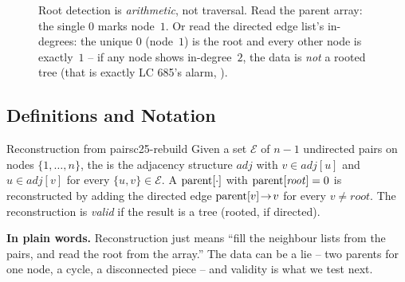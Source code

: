 \begin{figure}[H]
\centering
{}
\caption{Root detection is \emph{arithmetic}, not traversal. Read the parent array: the single $0$
marks node~$1$. Or read the directed edge list's in-degrees: the unique $0$ (node~$1$) is the root
and every other node is exactly~$1$ -- if any node shows in-degree~$2$, the data is \emph{not} a rooted
tree (that is exactly LC 685's alarm, ).}\label{fig:c25-rootdetect}
\end{figure}

\subsection{Definitions and Notation}

\begin{definition}{Reconstruction from pairs}{c25-rebuild}
Given a set $\mathcal{E}$ of $n-1$ undirected pairs on nodes $\{1,\dots,n\}$, the
 is the adjacency structure $\mathit{adj}$ with $v\in\mathit{adj}[u]$ and
$u\in\mathit{adj}[v]$ for every $\{u,v\}\in\mathcal{E}$. A  $\operatorname{parent}[\cdot]$
with $\operatorname{parent}[\mathit{root}]=0$ is reconstructed by adding the directed edge
$\operatorname{parent}[v]\!\to\!v$ for every $v\ne\mathit{root}$. The reconstruction is \emph{valid} if the
result is a tree (rooted, if directed).
\end{definition}

\noindent\textbf{In plain words.} Reconstruction just means ``fill the neighbour lists from the
pairs, and read the root from the array.'' The data can be a lie -- two parents for one node, a
cycle, a disconnected piece -- and validity is what we test next.


